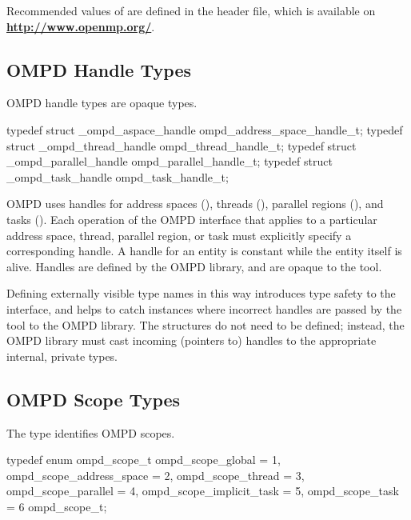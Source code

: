Recommended values of  are defined in the 
 header file, which is available on 
\textbf{\url{http://www.openmp.org/}}.



\subsection{OMPD Handle Types}
\label{subsubsec:ompd_address_space_handle_t}
\label{subsubsec:ompd_thread_handle_t}
\label{subsubsec:ompd_parallel_handle_t}
\label{subsubsec:ompd_task_handle_t}

\summary
OMPD handle types are opaque types.

\format
\begin{ccppspecific}
\begin{ompSyntax}
typedef struct _ompd_aspace_handle ompd_address_space_handle_t;
typedef struct _ompd_thread_handle ompd_thread_handle_t;
typedef struct _ompd_parallel_handle ompd_parallel_handle_t;
typedef struct _ompd_task_handle ompd_task_handle_t;
\end{ompSyntax}
\end{ccppspecific}

\descr
OMPD uses handles for address spaces (),
threads (), parallel regions 
(), and tasks ().
Each operation of the OMPD interface that applies to a particular address 
space, thread, parallel region, or task must explicitly specify a corresponding 
handle. A handle for an entity is constant while the entity itself is alive. 
Handles are defined by the OMPD library, and are opaque to the tool.

Defining externally visible type names in this way introduces type safety to 
the interface, and helps to catch instances where incorrect handles are passed 
by the tool to the OMPD library. The structures do not need to be defined;
instead, the OMPD library must cast incoming (pointers to) handles to the 
appropriate internal, private types.



\subsection{OMPD Scope Types}
\label{subsubsec:ompd_scope_t}

\summary
The  type identifies OMPD scopes.

\format
\begin{ccppspecific}
\begin{ompSyntax}
typedef enum ompd_scope_t {
  ompd_scope_global = 1,
  ompd_scope_address_space = 2,
  ompd_scope_thread = 3,
  ompd_scope_parallel = 4,
  ompd_scope_implicit_task = 5,
  ompd_scope_task = 6
} ompd_scope_t;
\end{ompSyntax}
\end{ccppspecific}

